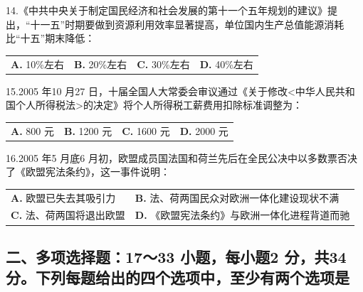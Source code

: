 \documentclass[UTF8,11pt]{ctexart}
\begin{document}
14.《中共中央关于制定国民经济和社会发展的第十一个五年规划的建议》提出，“十一五”时期要做到资源利用效率显著提高，单位国内生产总值能源消耗比“十五”期末降低：


\begin{center}\begin{tabular}{>{\raggedright\arraybackslash}p{\dimexpr(\linewidth-8\tabcolsep)/4\relax}>{\raggedright\arraybackslash}p{\dimexpr(\linewidth-8\tabcolsep)/4\relax}>{\raggedright\arraybackslash}p{\dimexpr(\linewidth-8\tabcolsep)/4\relax}>{\raggedright\arraybackslash}p{\dimexpr(\linewidth-8\tabcolsep)/4\relax}}
\textbf{A.} 10\%左右 & \textbf{B.} 20\%左右 & \textbf{C.} 30\%左右 & \textbf{D.} 40\%左右\\[.35em]\end{tabular}\end{center}

15.2005 年10 月27 日，十届全国人大常委会审议通过《关于修改<中华人民共和国个人所得税法>的决定》将个人所得税工薪费用扣除标准调整为：


\begin{center}\begin{tabular}{>{\raggedright\arraybackslash}p{\dimexpr(\linewidth-8\tabcolsep)/4\relax}>{\raggedright\arraybackslash}p{\dimexpr(\linewidth-8\tabcolsep)/4\relax}>{\raggedright\arraybackslash}p{\dimexpr(\linewidth-8\tabcolsep)/4\relax}>{\raggedright\arraybackslash}p{\dimexpr(\linewidth-8\tabcolsep)/4\relax}}
\textbf{A.} 800 元 & \textbf{B.} 1200 元 & \textbf{C.} 1600 元 & \textbf{D.} 2000 元\\[.35em]\end{tabular}\end{center}

16.2005 年5 月底6 月初，欧盟成员国法国和荷兰先后在全民公决中以多数票否决了《欧盟宪法条约》，这一事件说明：


\begin{center}\begin{tabular}{>{\raggedright\arraybackslash}p{\dimexpr(\linewidth-4\tabcolsep)/2\relax}>{\raggedright\arraybackslash}p{\dimexpr(\linewidth-4\tabcolsep)/2\relax}}
\textbf{A.} 欧盟已失去其吸引力 & \textbf{B.} 法、荷两国民众对欧洲一体化建设现状不满\\[.35em]
\textbf{C.} 法、荷两国将退出欧盟 & \textbf{D.} 《欧盟宪法条约》与欧洲一体化进程背道而驰\\[.35em]\end{tabular}\end{center}

\subsection*{二、多项选择题：17～33 小题，每小题2 分，共34 分。下列每题给出的四个选项中，至少有两个选项是}
\end{document}
